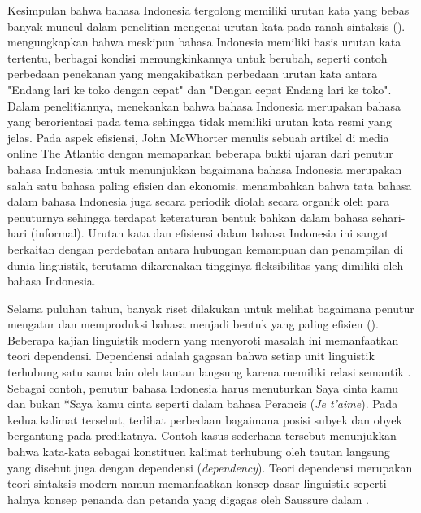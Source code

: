 Kesimpulan bahwa bahasa Indonesia tergolong memiliki urutan kata yang bebas banyak muncul dalam penelitian mengenai urutan kata pada ranah sintaksis (\citealp{stack2005word, postman2004processing}). \cite{sneddon2010indonesian} mengungkapkan bahwa meskipun bahasa Indonesia memiliki basis urutan kata tertentu, berbagai kondisi memungkinkannya untuk berubah, seperti contoh perbedaan penekanan yang mengakibatkan perbedaan urutan kata antara "Endang lari ke toko dengan cepat" dan "Dengan cepat Endang lari ke toko". Dalam penelitiannya, \cite{postman2004processing} menekankan bahwa bahasa Indonesia merupakan bahasa yang berorientasi pada tema sehingga tidak memiliki urutan kata resmi yang jelas. Pada aspek efisiensi, John McWhorter menulis sebuah artikel di media online The Atlantic \citep{mcwhorter2016efficient} dengan memaparkan beberapa bukti ujaran dari penutur bahasa Indonesia untuk menunjukkan bagaimana bahasa Indonesia merupakan salah satu bahasa paling efisien dan ekonomis. \cite{mcwhorter2016efficient} menambahkan bahwa tata bahasa dalam bahasa Indonesia juga secara periodik diolah secara organik oleh para penuturnya sehingga terdapat keteraturan bentuk bahkan dalam bahasa sehari-hari (informal). Urutan kata dan efisiensi dalam bahasa Indonesia ini sangat berkaitan dengan perdebatan antara hubungan kemampuan dan penampilan di dunia linguistik, terutama dikarenakan tingginya fleksibilitas yang dimiliki oleh bahasa Indonesia.

Selama puluhan tahun, banyak riset dilakukan untuk melihat bagaimana penutur mengatur dan memproduksi bahasa menjadi bentuk yang paling efisien (\citealp{chomsky2005three, hawkins2004efficiency, zipf1935psycho, zipf1949human}). Beberapa kajian linguistik modern yang menyoroti masalah ini memanfaatkan teori dependensi. Dependensi adalah gagasan bahwa setiap unit linguistik terhubung satu sama lain oleh tautan langsung karena memiliki relasi semantik \citep{tesniere1959elements}. Sebagai contoh, penutur bahasa Indonesia harus menuturkan Saya cinta kamu dan bukan *Saya kamu cinta seperti dalam bahasa Perancis (\textit{Je t'aime}). Pada kedua kalimat tersebut, terlihat perbedaan bagaimana posisi subyek dan obyek bergantung pada predikatnya. Contoh kasus sederhana tersebut menunjukkan bahwa kata-kata sebagai konstituen kalimat terhubung oleh tautan langsung yang disebut juga dengan dependensi (\textit{dependency}). Teori dependensi merupakan teori sintaksis modern namun memanfaatkan konsep dasar linguistik seperti halnya konsep penanda dan petanda yang digagas oleh Saussure dalam \cite{key2017course}. 


